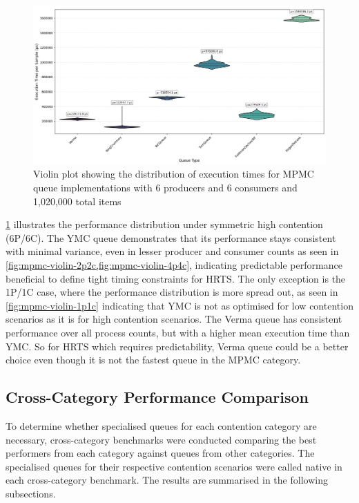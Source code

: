 \begin{figure}[htb]
\centering
\caption{Violin plot showing the distribution of execution times for MPMC queue implementations with 6 producers and 6 consumers and 1,020,000 total items}
\label{fig:mpmc-violin-6p6c}
\includegraphics[width=\textwidth]{images/results/mpmc_performance_violin_6P_6C.png}
\end{figure}

\cref{fig:mpmc-violin-6p6c} illustrates the performance distribution under symmetric high contention (6P/6C). The \ac{YMC} queue demonstrates that its performance stays consistent with minimal variance, even in lesser producer and consumer counts as seen in \cref{fig:mpmc-violin-2p2c,fig:mpmc-violin-4p4c}, indicating predictable performance beneficial to define tight timing constraints for \ac{HRTS}. The only exception is the 1P/1C case, where the performance distribution is more spread out, as seen in \cref{fig:mpmc-violin-1p1c} indicating that \ac{YMC} is not as optimised for low contention scenarios as it is for high contention scenarios. The Verma queue has consistent performance over all process counts, but with a higher mean execution time than \ac{YMC}. So for \ac{HRTS} which requires predictability, Verma queue could be a better choice even though it is not the fastest queue in the \ac{MPMC} category.

\subsection{Cross-Category Performance Comparison}
To determine whether specialised queues for each contention category are necessary, cross-category benchmarks were conducted comparing the best performers from each category against queues from other categories. The specialised queues for their respective contention scenarios were called native in each cross-category benchmark. The results are summarised in the following subsections.


